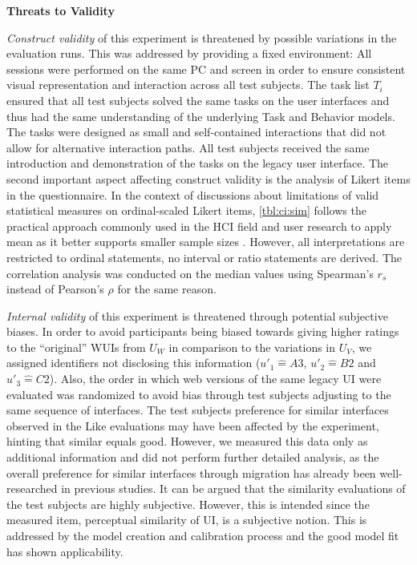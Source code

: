 \textbf{Threats to Validity}

\emph{Construct validity} of this experiment is threatened by possible variations in the evaluation runs.
This was addressed by providing a fixed environment: All sessions were performed on the same PC and screen in order to ensure consistent visual representation and interaction across all test subjects.
The task list \(T_i\) ensured that all test subjects solved the same tasks on the user interfaces and thus had the same understanding of the underlying Task and Behavior models.
The tasks were designed as small and self-contained interactions that did not allow for alternative interaction paths.
All test subjects received the same introduction and demonstration of the tasks on the legacy user interface.
The second important aspect affecting construct validity is the analysis of Likert items in the questionnaire.
In the context of discussions about limitations of valid statistical measures on ordinal-scaled Likert items, \cref{tbl:ci:sim} follows the practical approach commonly used in the HCI field and user research to apply mean as it better supports smaller sample sizes \autocite{Sauro2016}.
However, all interpretations are restricted to ordinal statements, no interval or ratio statements are derived.
The correlation analysis was conducted on the median values using Spearman's \(r_s\) instead of Pearson's \(\rho\) for the same reason.

\emph{Internal validity} of this experiment is threatened through potential subjective biases.
In order to avoid participants being biased towards giving higher ratings to the ``original'' WUIs from \(U_W\) in comparison to the variations in \(U_V\), we assigned identifiers not disclosing this information (\(u'_1 \widehat{=} A3\), \(u'_2\widehat{=} B2\) and \(u'_3\widehat{=} C2\)).
Also, the order in which web versions of the same legacy UI were evaluated was randomized to avoid bias through test subjects adjusting to the same sequence of interfaces.
The test subjects preference for similar interfaces observed in the \(\text{Like}\) evaluations may have been affected by the experiment, hinting that similar equals good.
However, we measured this data only as additional information and did not perform further detailed analysis, as the overall preference for similar interfaces through migration has already been well-researched in previous studies.
It can be argued that the similarity evaluations of the test subjects are highly subjective.
However, this is intended since the measured item, perceptual similarity of UI, is a subjective notion.
This is addressed by the model creation and calibration process and the good model fit has shown applicability.

